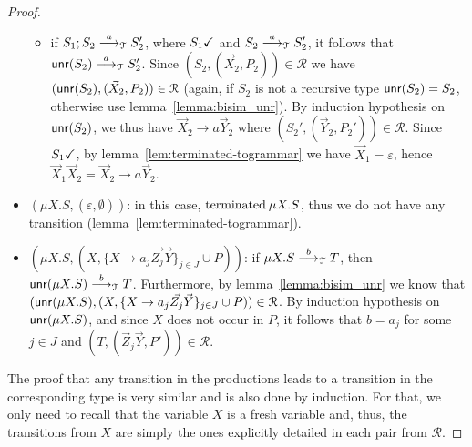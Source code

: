 \begin{proof}
\begin{itemize}
\begin{itemize}
    	\item if $S_1;S_2\LTSderives[a] S_2'$, where $\DONE{S_1}$ and 
    	$S_2\LTSderives[a] S_2'$, it follows that 
    	$\Unravel(S_2)\LTSderives[a] S_2'$. 
    	Since $(S_2, (\vec X_2, P_2))\in \mathcal{R}$ we have 
    	$(\Unravel(S_2), (\vec X_2, P_2))\in \mathcal{R}$ (again, 
    	if $S_2$ is not a recursive type $\Unravel(S_2)=S_2$, 
    	otherwise use lemma~\ref{lemma:bisim_unr}). 
    	By induction hypothesis on $\Unravel(S_2)$, we thus have
    	$\vec X_2 \rightarrow a \vec Y_2$ where 
    	$(S_2', (\vec Y_2,P_2'))\in \mathcal{R}$. Since $\DONE{S_1}$, by
    	lemma~\ref{lem:terminated-togrammar} we have $\vec X_1 = \varepsilon$, 
    	hence $\vec X_1 \vec X_2 = \vec X_2 \rightarrow a \vec Y_2$.
    	\end{itemize}
    	\item $(\mu X.S, (\varepsilon, \emptyset))$: in this case, 
    	$\isCheckedf \mu X.S$, thus
    	we do not have any transition (lemma~\ref{lem:terminated-togrammar}).
    	\item $(\mu X.S, (X, \{X \rightarrow a_j \vec {Z_j}\vec Y\}_{j\in J} \cup  P))$: 
    	if $\mu X.S\LTSderives[b] T$, then $\Unravel(\mu X.S)\LTSderives[b] T$.
    	Furthermore, by lemma~\ref{lemma:bisim_unr} we know that 
    	$(\Unravel(\mu X.S), (X, \{X \rightarrow a_j \vec {Z_j}\vec Y\}_{j\in J} \cup  P))
    	\in\mathcal{R}$. By induction hypothesis on $\Unravel(\mu X.S)$, 
    	and since $X$ does not occur in $P$, it follows 
    	that $b=a_j$ for some $j\in J$ and $(T, (\vec Z_j \vec Y, P'))\in \mathcal{R}$.
	\end{itemize} 
	The proof that any transition in the productions leads to a transition in 
	the corresponding type is very similar and is also done by induction. 
	For that,
	we only need to recall that the variable $X$ is a fresh variable and, thus, 
	the transitions from $X$ are simply the ones explicitly detailed in each 
	pair from $\mathcal{R}$.
\end{proof}



